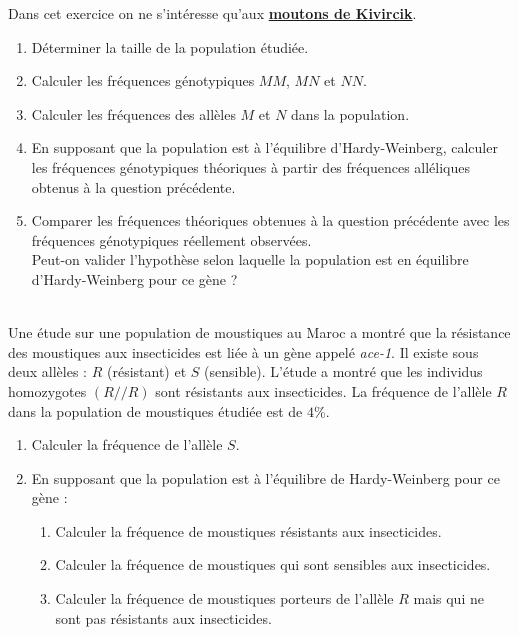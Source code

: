 \documentclass[11pt]{article}
\begin{document}
Dans cet exercice on ne s'intéresse qu'aux \underline{\textbf{moutons de Kivircik}}.

\begin{enumerate}[leftmargin=*]
	\item Déterminer la taille de la population étudiée.
	\item Calculer les fréquences génotypiques $MM$, $MN$ et $NN$. 
	\item Calculer les fréquences des allèles $M$ et $N$ dans la population.
	\item En supposant que la population est à l’équilibre d’Hardy-Weinberg, calculer les fréquences génotypiques théoriques à partir des fréquences alléliques obtenus à la question précédente.
	\item Comparer les fréquences théoriques obtenues à la question précédente avec les fréquences génotypiques réellement observées. \\ Peut-on valider l’hypothèse selon laquelle la population 	est en équilibre d’Hardy-Weinberg pour ce gène ?
\end{enumerate}

\vspace{11pt}

\exercice \\

Une étude sur une population de moustiques au Maroc a montré que la résistance
des moustiques aux insecticides est liée à un gène appelé \emph{ace-1}. Il
existe sous deux allèles : $R$ (résistant) et $S$ (sensible). L'étude a montré que
les individus homozygotes $(R//R)$ sont résistants aux insecticides. La
fréquence de l'allèle $R$ dans la population de moustiques étudiée est de $4$\%.

\begin{enumerate}[leftmargin=*]
	\item Calculer la fréquence de l’allèle $S$.
	\item En supposant que la population est à l’équilibre de Hardy-Weinberg pour ce gène :
	\begin{enumerate}[leftmargin=*,label=\alph*.]
		\item Calculer la fréquence de moustiques résistants aux insecticides.
		\item Calculer la fréquence de moustiques qui sont sensibles aux
          insecticides.
		\item Calculer la fréquence de moustiques porteurs de l’allèle $R$ mais
          qui ne sont pas résistants aux insecticides.
	\end{enumerate}
\end{enumerate}
\end{document}
